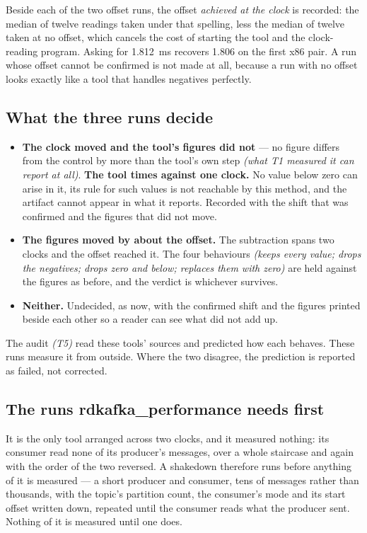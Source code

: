\documentclass[11pt]{article}
\newcommand{\gl}[1]{{\color{soft}\itshape\small (#1)}}
\begin{document}
Beside each of the two offset runs, the offset \emph{achieved at the clock} is recorded: the
median of twelve readings taken under that spelling, less the median of twelve taken at no
offset, which cancels the cost of starting the tool and the clock-reading program. Asking for
1.812~ms recovers 1.806 on the first x86 pair. A run whose offset cannot be confirmed is not made
at all, because a run with no offset looks exactly like a tool that handles negatives perfectly.

\subsection*{What the three runs decide}
\begin{itemize}
  \item \textbf{The clock moved and the tool's figures did not} --- no figure differs from the
        control by more than the tool's own step \gl{what T1 measured it can report at all}.
        \textbf{The tool times against one clock.} No value below zero can arise in it, its rule
        for such values is not reachable by this method, and the artifact cannot appear in what it
        reports. Recorded with the shift that was confirmed and the figures that did not move.
  \item \textbf{The figures moved by about the offset.} The subtraction spans two clocks and the
        offset reached it. The four behaviours \gl{keeps every value; drops the negatives; drops
        zero and below; replaces them with zero} are held against the figures as before, and the
        verdict is whichever survives.
  \item \textbf{Neither.} Undecided, as now, with the confirmed shift and the figures printed
        beside each other so a reader can see what did not add up.
\end{itemize}

The audit \gl{T5} read these tools' sources and predicted how each behaves. These runs measure it
from outside. Where the two disagree, the prediction is reported as failed, not corrected.

\subsection*{The runs rdkafka\_performance needs first}
It is the only tool arranged across two clocks, and it measured nothing: its consumer read none of
its producer's messages, over a whole staircase and again with the order of the two reversed. A
shakedown therefore runs before anything of it is measured --- a short producer and consumer,
tens of messages rather than thousands, with the topic's partition count, the consumer's mode and
its start offset written down, repeated until the consumer reads what the producer sent. Nothing
of it is measured until one does.
\end{document}
